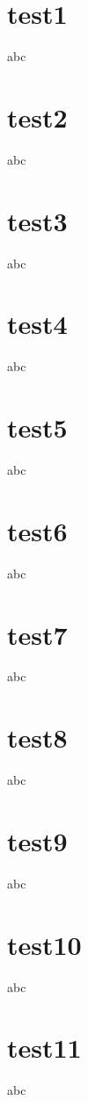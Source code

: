 \documentclass{beamer}
\begin{document}
\section{test1}\begin{frame}abc\end{frame}  
\section{test2}\begin{frame}abc\end{frame}  
\section{test3}\begin{frame}abc\end{frame}  
\section{test4}\begin{frame}abc\end{frame}  
\section{test5}\begin{frame}abc\end{frame}  
\section{test6}\begin{frame}abc\end{frame}  
\section{test7}\begin{frame}abc\end{frame}  
\section{test8}\begin{frame}abc\end{frame}  
\section{test9}\begin{frame}abc\end{frame}  
\section{test10}\begin{frame}abc\end{frame} 
\section{test11}\begin{frame}abc\end{frame}     
\end{document}
